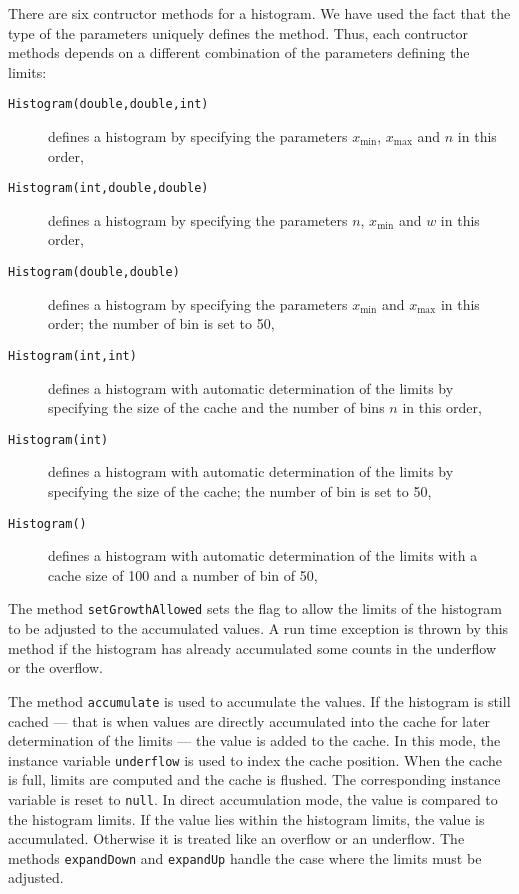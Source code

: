 \documentclass[twoside]{book}
\begin{document}
There are six contructor methods for a histogram. We have used the
fact that the type of the parameters uniquely defines the method.
Thus, each contructor methods depends on a different combination
of the parameters defining the limits:
\begin{description}
  \item[\tt Histogram(double,double,int)] defines a histogram by
  specifying the parameters $x_{\min}$, $x_{\max}$ and $n$ in this
  order,
  \item[\tt Histogram(int,double,double)] defines a histogram by
  specifying the parameters $n$, $x_{\min}$ and $w$ in this
  order,
  \item[\tt Histogram(double,double)] defines a histogram by
  specifying the parameters $x_{\min}$ and $x_{\max}$ in this
  order; the number of bin is set to 50,
  \item[\tt Histogram(int,int)] defines a histogram with automatic
  determination of the limits by specifying the size of the cache and
  the number of bins $n$ in this order,
  \item[\tt Histogram(int)] defines a histogram with automatic
  determination of the limits by specifying the size of the cache;
  the number of bin is set to 50,
  \item[\tt Histogram()] defines a histogram with automatic
  determination of the limits with a cache size of 100 and
  a number of bin of 50,
\end{description}

The method {\tt setGrowthAllowed} sets the flag to allow the
limits of the histogram to be adjusted to the accumulated values.
A run time exception is thrown by this method if the histogram has
already accumulated some counts in the underflow or the overflow.

The method {\tt accumulate} is used to accumulate the values. If
the histogram is still cached
--- that is when values are directly accumulated into the cache
for later determination of the limits
--- the value is added to the cache. In this mode, the instance
variable {\tt underflow} is used to index the cache position. When
the cache is full, limits are computed and the cache is flushed.
The corresponding instance variable is reset to {\tt null}. In
direct accumulation mode, the value is compared to the histogram
limits. If the value lies within the histogram limits, the value
is accumulated. Otherwise it is treated like an overflow or an
underflow. The methods {\tt expandDown} and {\tt expandUp} handle
the case where the limits must be adjusted.
\end{document}
